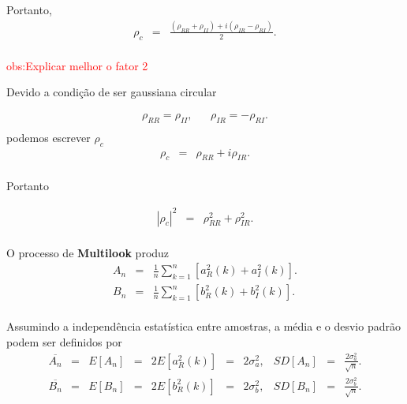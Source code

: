 \documentclass[12pt,a4paper]{article}
\begin{document}
Portanto, 
\begin{equation}\label{sec1eqn16}
\begin{array}{ccc}
	\rho_c&=&\frac{(\rho_{RR}+\rho_{II})+i(\rho_{IR}-\rho_{RI})}{2}. \\
\end{array}
\end{equation}

\textcolor{red}{obs:Explicar melhor o fator 2}

Devido a condição de ser gaussiana circular

\begin{equation}\label{sec1eqn17}
\begin{array}{ccc}
	\rho_{RR}=\rho_{II},&&\rho_{IR}=-\rho_{RI}. \\
\end{array}
\end{equation}
podemos escrever $\rho_c$
\begin{equation}\label{sec1eqn18}
\begin{array}{ccc}
	\rho_c&=&\rho_{RR}+i\rho_{IR}. \\
\end{array}
\end{equation}

Portanto

\begin{equation}\label{sec1eqn19}
\begin{array}{ccc}
	\left|\rho_c\right|^2&=&\rho_{RR}^2+\rho_{IR}^2. \\
\end{array}
\end{equation}

O processo de {\bf Multilook} produz
\begin{equation}\label{sec1eqn20}
\begin{array}{ccc}
	A_n&=&\frac{1}{n}\displaystyle{\sum_{k=1}^{n} [a_{R}^2(k)+a_{I}^2(k)]}. \\
	B_n&=&\frac{1}{n}\displaystyle{\sum_{k=1}^{n} [b_{R}^2(k)+b_{I}^2(k)]}. \\
\end{array}
\end{equation}


Assumindo a independência estatística entre amostras, a média e o desvio padrão podem ser definidos por
\begin{equation}\label{sec1eqn21}
\begin{array}{cccccccccccc}
	\overline{A_n}&=&E[A_n]&=&2E[a_{R}^2(k)]&=&2\sigma_a^2,&SD[A_n]&=&\frac{2\sigma_a^2}{\sqrt{n}}.\\
	\overline{B_n}&=&E[B_n]&=&2E[b_{R}^2(k)]&=&2\sigma_b^2,&SD[B_n]&=&\frac{2\sigma_b^2}{\sqrt{n}}.\\
\end{array}
\end{equation}
\end{document}
